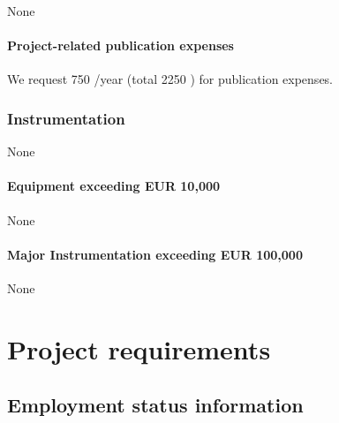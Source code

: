 \documentclass[10pt,fleqn,twoside]{article}
\begin{document}
None

\paragraph{Project-related publication expenses}

We request 750 \EUR{}/year (total 2250 \EUR{}) for publication expenses.

\subsubsection{Instrumentation}

None

\paragraph{Equipment exceeding EUR 10,000} 

None

\paragraph{Major Instrumentation exceeding EUR 100,000} 

None 

% 
% 
% 
% 
% 
% 
% 

\section{Project requirements}
\renewcommand{\leftmark}{\sc Project requirements}

\subsection{Employment status information}
\end{document}
